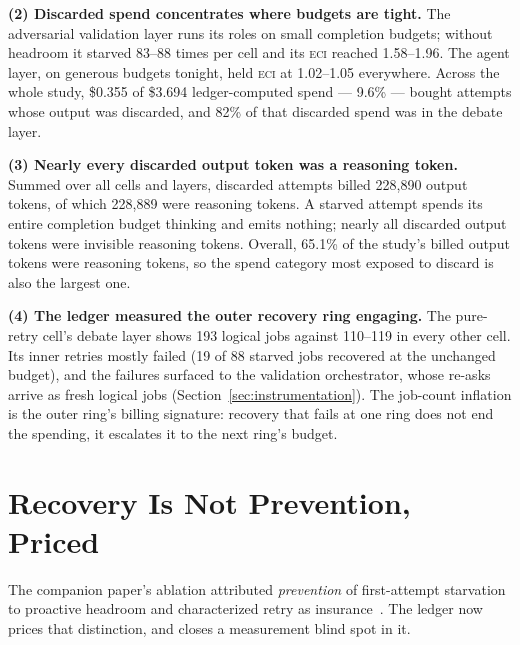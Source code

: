 \documentclass[11pt]{article}
\newcommand{\eci}{\textsc{eci}}
\begin{document}
\textbf{(2) Discarded spend concentrates where budgets are tight.} The
adversarial validation layer runs its roles on small completion
budgets; without headroom it starved 83--88 times per cell and its
\eci{} reached 1.58--1.96. The agent layer, on generous budgets
tonight, held \eci{} at 1.02--1.05 everywhere. Across the whole study,
\$0.355 of \$3.694 ledger-computed spend --- 9.6\% --- bought attempts
whose output was discarded, and 82\% of that discarded spend was in the
debate layer.

\textbf{(3) Nearly every discarded output token was a reasoning token.}
Summed over all cells and layers, discarded attempts billed 228{,}890
output tokens, of which 228{,}889 were reasoning tokens. A starved
attempt spends its entire completion budget thinking and emits nothing;
nearly all discarded output tokens were invisible reasoning tokens. Overall, 65.1\% of the study's billed
output tokens were reasoning tokens, so the spend category most
exposed to discard is also the largest one.

\textbf{(4) The ledger measured the outer recovery ring engaging.} The
pure-retry cell's debate layer shows 193 logical jobs against 110--119
in every other cell. Its inner retries mostly failed (19 of 88 starved
jobs recovered at the unchanged budget), and the failures surfaced to
the validation orchestrator, whose re-asks arrive as fresh logical
jobs (Section~\ref{sec:instrumentation}). The job-count inflation is
the outer ring's billing signature: recovery that fails at one ring
does not end the spending, it escalates it to the next ring's budget.

\section{Recovery Is Not Prevention, Priced}\label{sec:prevention}

The companion paper's ablation attributed \emph{prevention} of
first-attempt starvation to proactive headroom and characterized retry
as insurance~\cite{reliability}. The ledger now prices that
distinction, and closes a measurement blind spot in it.
\end{document}
